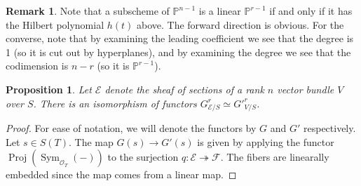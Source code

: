 \documentclass[10pt]{article}
\newtheorem{prop}[thm]{Proposition}
\theoremstyle{definition}
\newtheorem{rmk}[thm]{Remark}
\DeclareMathOperator{\Sym}{Sym}
\DeclareMathOperator{\Proj}{Proj}
\newcommand{\PP}{\mathbb{P}}
\newcommand{\OO}{\mathcal{O}}
\begin{document}
\begin{rmk}
Note that a subscheme of $\PP^{n-1}$ is a linear $\PP^{r-1}$ if and only if it has the Hilbert polynomial $h(t)$ above.  The forward direction is obvious.  For the converse, note that by examining the leading coefficient we see that the degree is 1 (so it is cut out by hyperplanes), and by examining the degree we see that the codimension is $n-r$ (so it is $\PP^{r-1}$).
\end{rmk}


\begin{prop}
Let $\mathcal{E}$ denote the sheaf of sections of a rank $n$ vector bundle $V$ over $S$.  There is an isomorphism of functors $G^r_{\mathcal{E}/S} \simeq G'^r_{V/S}$.
\end{prop}
\begin{proof}
For ease of notation, we will denote the functors by $G$ and $G'$ respectively.   Let $s \in S(T)$.  The map $G(s) \rightarrow G'(s)$ is given by applying the functor $\Proj(\Sym_{\OO_T}(-))$ to the surjection $q: \mathcal{E} \twoheadrightarrow \mathcal{F}$.  The fibers are linearally embedded since the map comes from a linear map.


\end{proof}
\end{document}
